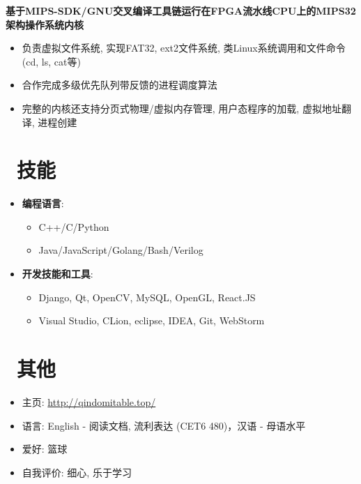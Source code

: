 \documentclass{resume}
\begin{document}
\textbf{基于MIPS-SDK/GNU交叉编译工具链运行在FPGA流水线CPU上的MIPS32架构操作系统内核}
\begin{itemize}
  \item 负责虚拟文件系统, 实现FAT32, ext2文件系统, 类Linux系统调用和文件命令(cd, ls, cat等)
  \item 合作完成多级优先队列带反馈的进程调度算法
  \item 完整的内核还支持分页式物理/虚拟内存管理, 用户态程序的加载, 虚拟地址翻译, 进程创建
\end{itemize}


\section{\faCogs\ 技能}
\begin{itemize}[parsep=0.5ex]
  \item \textbf{编程语言}:
	\begin{itemize}
    	  \item C++/C/Python
       \item Java/JavaScript/Golang/Bash/Verilog
	\end{itemize}
  \item \textbf{开发技能和工具}:
	 \begin{itemize}
    	   \item Django, Qt, OpenCV, MySQL, OpenGL, React.JS
	   \item Visual Studio, CLion, eclipse, IDEA, Git, WebStorm
	 \end{itemize}
\end{itemize}

\section{\faInfo\ 其他}
\begin{itemize}[parsep=0.5ex]
  \item 主页: \url{http://qindomitable.top/}
  \item 语言: English - 阅读文档, 流利表达 (CET6 480)，汉语 - 母语水平
  \item 爱好: 篮球
  \item 自我评价: 细心, 乐于学习
\end{itemize}
\end{document}
